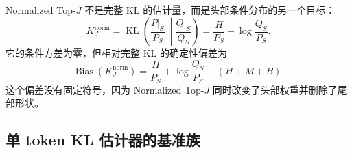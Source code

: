 \documentclass[lang=cn,scheme=chinese,openany]{../book/elegantbook}
\newcommand{\KL}{\operatorname{KL}}
\begin{document}
Normalized Top-$J$ 不是完整 KL 的估计量，而是头部条件分布的另一个目标：
\begin{equation*}
 K^{\mathrm{norm}}_J
 =\KL\left(\frac{P|_S}{P_S}\middle\|\frac{Q|_S}{Q_S}\right)
 =\frac{H}{P_S}+\log\frac{Q_S}{P_S}.
\end{equation*}
它的条件方差为零，但相对完整 KL 的确定性偏差为
\begin{equation}
 \operatorname{Bias}(K^{\mathrm{norm}}_J)
 =\frac{H}{P_S}+\log\frac{Q_S}{P_S}-(H+M+B).
 \label{est:eq:chapter3-normalized-bias}
\end{equation}
这个偏差没有固定符号，因为 Normalized Top-$J$ 同时改变了头部权重并删除了尾部形状。

\subsection{单 token KL 估计器的基准族}
\end{document}
